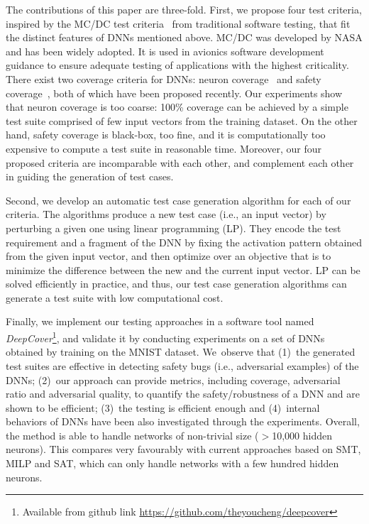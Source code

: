 \documentclass[runningheads,a4paper]{llncs}
\begin{document}
The contributions of this paper are three-fold. 
%
First, we propose four test criteria, inspired by the MC/DC test
criteria~\cite{HVCR2001} from traditional software testing, that fit the
distinct features of DNNs mentioned above. MC/DC was developed by NASA and 
has been widely adopted. It is used in avionics software development guidance to 
ensure adequate testing of applications with the highest criticality.
There exist two coverage criteria for DNNs: neuron coverage~\cite{PCYJ2017} and
safety coverage~\cite{WHK2018}, both of which have been proposed recently.  Our
experiments show that neuron coverage is too coarse: 100\% coverage can be
achieved by a simple test suite comprised of few input vectors from the training dataset.  On
the other hand, safety coverage is black-box, too fine, and it is
computationally too expensive to compute a test suite in reasonable time.
Moreover, our four proposed criteria are incomparable with each other, and
complement each other in guiding the generation of test cases.

Second, we develop an automatic test case generation algorithm for each of
our criteria.  The algorithms produce a new test case (i.e., an input
vector) by perturbing a given one using linear programming (LP).  They
encode the test requirement and a fragment of the DNN by fixing the
activation pattern obtained from the given input vector, and then optimize
over an objective that is to minimize the difference between the new and the
current input vector.  LP can be solved efficiently in practice, and thus,
our test case generation algorithms can generate a test suite with
low computational cost.

Finally, we implement our testing approaches in a software tool named
\emph{DeepCover}\footnote{Available from github link \url{https://github.com/theyoucheng/deepcover}},
and validate it by conducting
experiments on a set of DNNs obtained by training on the MNIST dataset. 
We~observe that (1)~the generated test suites are effective in detecting
safety bugs (i.e., adversarial examples) of the DNNs; (2)~our approach can
provide metrics, including coverage, adversarial ratio and adversarial
quality, to quantify the safety/robustness of a DNN and are shown to be
efficient; (3)~the testing is efficient enough and (4)~internal behaviors of
DNNs have been also investigated through the experiments.  Overall, the
method is able to handle networks of non-trivial size ($>$10,000 hidden
neurons).  This compares very favourably with current approaches based on
SMT, MILP and SAT, which can only handle networks with a few hundred hidden
neurons.
\end{document}

